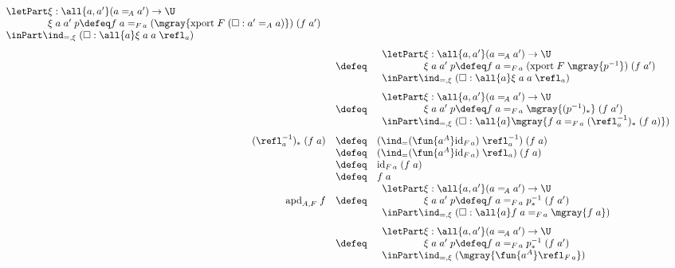 \documentclass[11pt]{article} %
\theoremstyle{definition}
\theoremstyle{remark}
\begin{document}
\[\begin{array}{rcl}
\begin{array}{l}
      \letPart \xi : \all{a,a'} (a =_{\!A} a') \to \U \\
      \phantom{\letPart\mathstrut} \xi\;a\;a'\;p\defeq f\;a =_{F\,a} (\mgray{\mathrm{xport}\;F\;(\square : a' =_A a)})\;(f\;a') \\
      \inPart \ind_{=,\xi}\;(\square : \all{a}\xi\;a\;a\;\refl_a) \\
    \end{array} \\ \\[-0.5em]
  &\defeq&
    \begin{array}{l}
      \letPart \xi : \all{a,a'} (a =_{\!A} a') \to \U \\
      \phantom{\letPart\mathstrut} \xi\;a\;a'\;p\defeq f\;a =_{F\,a} (\mathrm{xport}\;F\;\mgray{p^{-1}})\;(f\;a') \\
      \inPart \ind_{=,\xi}\;(\square : \all{a}\xi\;a\;a\;\refl_a) \\
    \end{array} \\ \\[-0.5em]
  &\defeq&
    \begin{array}{l}
      \letPart \xi : \all{a,a'} (a =_{\!A} a') \to \U \\
      \phantom{\letPart\mathstrut} \xi\;a\;a'\;p\defeq f\;a =_{F\,a} \mgray{(p^{-1})_*}\;(f\;a') \\
      \inPart \ind_{=,\xi}\;(\square : \all{a}\mgray{f\;a =_{F\,a} (\refl_a^{-1})_*\;(f\;a)}) \\
    \end{array} \\ \\[-0.5em]
  (\refl_a^{-1})_*\;(f\;a) &\defeq& (\ind_=(\fun{a^A}\mathrm{id}_{F\,a})\;\refl_a^{-1})\;(f\;a) \\
    &\defeq& (\ind_=(\fun{a^A}\mathrm{id}_{F\,a})\;\refl_a)\;(f\;a) \\
    &\defeq& \mathrm{id}_{F\,a}\;(f\;a) \\
    &\defeq& f\;a \\
  \mathrm{apd}_{A,F}\;f &\defeq&
    \begin{array}{l}
      \letPart \xi : \all{a,a'} (a =_{\!A} a') \to \U \\
      \phantom{\letPart\mathstrut} \xi\;a\;a'\;p\defeq f\;a =_{F\,a} p^{-1}_*\;(f\;a') \\
      \inPart \ind_{=,\xi}\;(\square : \all{a}f\;a =_{F\,a} \mgray{f\;a}) \\
    \end{array} \\ \\[-0.5em]
  &\defeq&
    \begin{array}{l}
      \letPart \xi : \all{a,a'} (a =_{\!A} a') \to \U \\
      \phantom{\letPart\mathstrut} \xi\;a\;a'\;p\defeq f\;a =_{F\,a} p^{-1}_*\;(f\;a') \\
      \inPart \ind_{=,\xi}\;(\mgray{\fun{a^A} \refl_{F\,a}}) \\
    \end{array} \\ \\[-0.5em]
\end{array}\]
\end{document}
